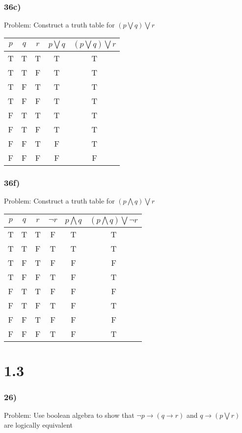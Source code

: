 \documentclass{article}
\begin{document}
\subsubsection*{36c)}
Problem: Construct a truth table for $(p \bigvee q) \bigvee r$
\begin{center}
\begin{tabular}{|c|c|c|c|c|}
\hline
$p$ & $q$ & $r$ & $p \bigvee q$ & $(p \bigvee q) \bigvee r$ \\
\hline
T & T & T & T & T \\
T & T & F & T & T \\
T & F & T & T & T \\
T & F & F & T & T \\
F & T & T & T & T \\
F & T & F & T & T \\
F & F & T & F & T \\
F & F & F & F & F \\
\hline
\end{tabular}
\end{center}
\subsubsection*{36f)}
Problem: Construct a truth table for $(p \bigwedge q) \bigvee r$
\begin{center}
\begin{tabular}{|c|c|c|c|c|c|}
\hline
$p$ & $q$ & $r$ & $\neg r$  & $p \bigwedge q$ & $(p \bigwedge q) \bigvee \neg r$ \\
\hline
T & T & T & F & T & T\\
T & T & F & T & T & T\\
T & F & T & F & F & F\\
T & F & F & T & F & T\\
F & T & T & F & F & F\\
F & T & F & T & F & T\\
F & F & T & F & F & F\\
F & F & F & T & F & T\\
\hline
\end{tabular}
\end{center}
\section*{1.3}
\subsubsection*{26)}
Problem: Use boolean algebra to show that $\neg p \rightarrow (q \rightarrow r)$ and $q \rightarrow (p \bigvee r)$ are logically equivalent
\end{document}
